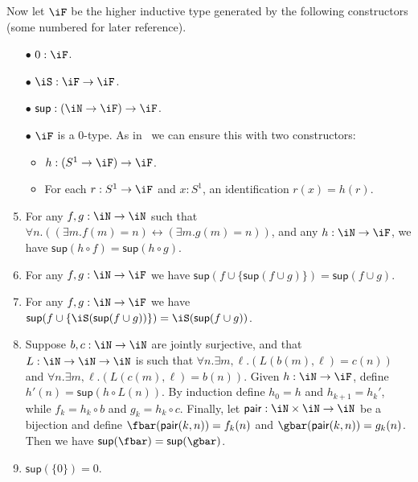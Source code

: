 \documentclass[referee]{psp}
\let\N\iN
\let\sec\S
\let\S\cS
\def\sup{\mathsf{sup}}
\begin{document}
Now let $\iF$ be the higher inductive type generated by the following constructors (some numbered for later reference).
\begin{enumerate}
\renewcommand{\theenumi}{(\arabic{enumi})}
\item[$\bullet$] $0:\iF$.
\item[$\bullet$] $\iS:\iF\to\iF$.
\item[$\bullet$] $\sup : (\N\to\iF)\to\iF$.
\item[$\bullet$] $\iF$ is a 0-type.
  As in~\cite[\sec7.3]{hottbook} we can ensure this with two constructors:
  \begin{itemize}
  \item $h: (S^1\to \iF) \to \iF$.
  \item For each $r:S^1\to\iF$ and $x:S^1$, an identification $r(x) = h(r)$.
  \end{itemize}
\item For any $f,g:\N\to\N$ such that $\forall n. ((\exists m. f(m)=n) \leftrightarrow (\exists m. g(m)=n))$, and any $h:\N\to \iF$, we have $\sup(h\circ f) = \sup(h\circ g)$.\label{item:f1}
\item For any $f,g:\N\to\iF$ we have $\sup(f \cup \{\sup(f\cup g)\}) = \sup(f\cup g)$.\label{item:f2}
\item For any $f,g:\N\to\iF$ we have $\sup(f \cup \{\iS(\sup(f\cup g))\}) = \iS(\sup(f\cup g))$.\label{item:f3}
\item Suppose $b,c:\N\to\N$ are jointly surjective, and that $L:\N\to\N\to\N$ is such that $\forall n. \exists m,\ell. (L(b(m),\ell)=c(n))$ and $\forall n. \exists m,\ell. (L(c(m),\ell)=b(n))$.
  Given $h:\N\to\iF$, define $h'(n) = \sup(h\circ L(n))$.
  By induction define $h_0 = h$ and $h_{k+1} = h_k'$, while $f_k = h_k \circ b$ and $g_k = h_k \circ c$.
  Finally, let $\mathsf{pair}:\N\times\N\to \N$ be a bijection and define $\fbar(\mathsf{pair}(k,n)) = f_k(n)$ and $\gbar(\mathsf{pair}(k,n)) = g_k(n)$.
  Then we have $\sup(\fbar) = \sup(\gbar)$.\label{item:f4}
\item $\sup(\{0\}) = 0$.\label{item:f5}
\end{enumerate}
\end{document}
